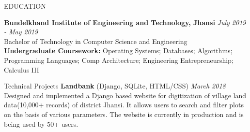 \documentclass{resume} %
\begin{document}
\begin{rSection}{EDUCATION}

{\bf Bundelkhand Institute of Engineering and Technology, Jhansi} \hfill {\em July 2019 - May 2019} 
\\ Bachelor of Technology in Computer Science and Engineering
\\ {\bf Undergraduate Coursework:} Operating Systems; Databases; Algorithms; Programming Languages; Comp Architecture; Engineering Entrepreneurship; Calculus III




\end{rSection}
\begin{rSection}{Technical Projects}
{\bf Landbank} (Django, SQLite, HTML/CSS) \hfill {\em  March 2018}
\\Designed  and implemented a Django based website for digitization of village land data(10,000+ records) of district Jhansi. It allows users to search and filter plots on the basis of various parameters. The website is currently in production and is being used by 50+ users.

\end{rSection}


\end{document}
